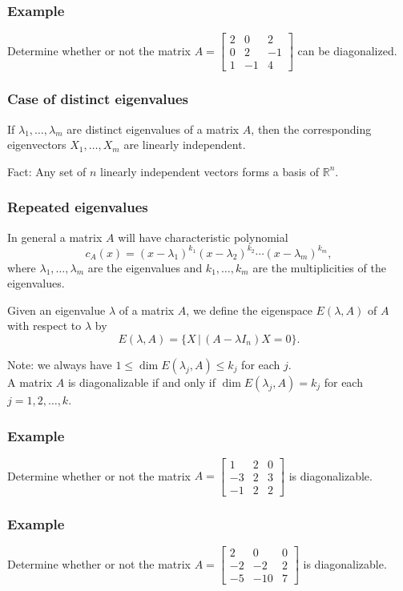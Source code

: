 \documentclass[11pt,t]{beamer}
\newcommand{\R}{\mathbb{R}}
\begin{document}
\begin{frame}
\frametitle{Example}
Determine whether or not the matrix $A = \begin{bmatrix}2&0&2\\0&2&-1\\1&-1&4\end{bmatrix}$ can be diagonalized.
\end{frame}

\begin{frame}
\frametitle{Case of distinct eigenvalues}

\begin{theorem}
If $\lambda_1,\ldots, \lambda_m$ are \alert{distinct} eigenvalues of a matrix $A$, then the corresponding eigenvectors $X_1,\ldots, X_m$ are linearly independent.
\end{theorem}

\medskip

\alert{Fact:} Any set of $n$ linearly independent vectors forms a basis of $\R^n$.

\end{frame}
\begin{frame}
\frametitle{Repeated eigenvalues}
In general a matrix $A$ will have characteristic polynomial
\[
c_A(x) = (x-\lambda_1)^{k_1}(x-\lambda_2)^{k_2}\cdots(x-\lambda_m)^{k_m},
\]
where $\lambda_1,\ldots, \lambda_m$ are the eigenvalues and $k_1,\ldots, k_m$ are the \alert{multiplicities} of the eigenvalues.

\begin{definition}
Given an eigenvalue $\lambda$ of a matrix $A$, we define the \alert{eigenspace} $E(\lambda, A)$ of $A$ with respect to $\lambda$ by
\[
E(\lambda, A) = \{X\,|\, (A-\lambda I_n)X=0\}.
\]
\end{definition}
Note: we always have $1\leq \dim E(\lambda_j,A)\leq k_j$ for each $j$. \\
A matrix $A$ is diagonalizable if and only if $\dim E(\lambda_j,A)=k_j$ for each $j=1,2,\ldots, k$.
\end{frame}
\begin{frame}
\frametitle{Example}

Determine whether or not the matrix $A=\begin{bmatrix}1&2&0\\-3&2&3\\-1&2&2\end{bmatrix}$ is diagonalizable.

\end{frame}
\begin{frame}
\frametitle{Example}

Determine whether or not the matrix $A=\begin{bmatrix}2&0&0\\-2&-2&2\\-5&-10&7\end{bmatrix}$ is diagonalizable.
\end{frame}
\end{document}

